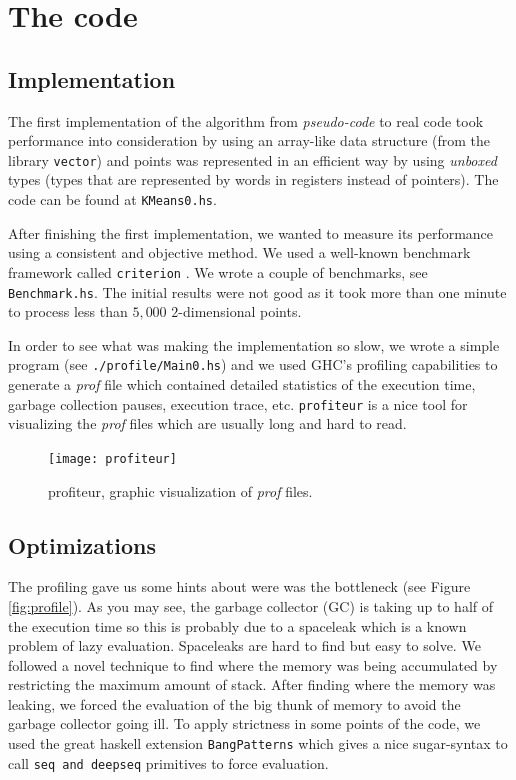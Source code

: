 \documentclass[12pt, a4paper]{article} %
\newcommand{\code}[1]{\texttt{#1}} %
\begin{document}
\section{The code}\label{s:intro}

\subsection{Implementation}\label{s:intro}

The first implementation of the algorithm from \textit{pseudo-code} to real code took performance into consideration by using an array-like data structure (from the library \code{vector}) and points was represented in an efficient way by using \textit{unboxed} types (types that are represented by words in registers instead of pointers). The code can be found at \code{KMeans0.hs}.

After finishing the first implementation, we wanted to measure its performance using a consistent and objective method. We used a well-known benchmark framework called \code{criterion} \cite{criterion}. We wrote a couple of benchmarks, see \code{Benchmark.hs}. The initial results were not good as it took more than one minute to process less than $5,000$ $2$-dimensional points.

\newpage

In order to see what was making the implementation so slow, we wrote a simple program (see \code{./profile/Main0.hs}) and we used GHC's profiling capabilities \cite{ghc_profiling} to generate a \textit{prof} file which contained detailed statistics of the execution time, garbage collection pauses, execution trace, etc. \code{profiteur} \cite{profiteur} is a nice tool for visualizing the \textit{prof} files which are usually long and hard to read.

\begin{figure}[h]
\texttt{[image: profiteur]}
\centering
  \caption{profiteur, graphic visualization of \textit{prof} files.}
\label{fig:profiteur}
\end{figure}

\subsection{Optimizations}\label{s:intro}

The profiling gave us some hints about were was the bottleneck (see Figure \ref{fig:profile}). As you may see, the garbage collector (GC) is taking up to half of the execution time so this is probably due to a spaceleak which is a known problem of lazy evaluation. Spaceleaks are hard to find but easy to solve. We followed a novel technique to find where the memory was being accumulated by restricting the maximum amount of stack. After finding where the memory was leaking, we forced the evaluation of the big thunk of memory to avoid the garbage collector going ill. To apply strictness in some points of the code, we used the great haskell extension \code{BangPatterns} which gives a nice sugar-syntax to call \code{seq and deepseq} primitives to force evaluation.
\end{document}

